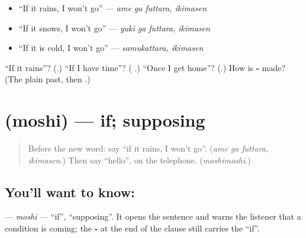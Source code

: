 \begin{itemize}
\raggedright
  \item \textquotedblleft{}If it rains, I won't go\textquotedblright{} — \emph{ame ga futtara, ikimasen}
  \item \textquotedblleft{}If it snows, I won't go\textquotedblright{} — \emph{yuki ga futtara, ikimasen}
  \item \textquotedblleft{}If it is cold, I won't go\textquotedblright{} — \emph{samukattara, ikimasen}
\end{itemize}

\begin{tcolorbox}[breakable,colback=teal!4,colframe=teal!35!black,title={Before you move on}]
\textquotedblleft{}If it rains\textquotedblright{}? (\textbf{}.) \textquotedblleft{}If I have time\textquotedblright{}? (\textbf{ }.) \textquotedblleft{}Once I get home\textquotedblright{}? (\textbf{}.) How is \textbf{-} made? (The plain past, then \textbf{}.)
\end{tcolorbox}
\section[\texorpdfstring{\ja{もし} (moshi)}{もし (moshi)}]{ (moshi) — if; supposing}

\label{lesson:JA-C260-moshi}



\begin{quote}
Before the new word: say \textquotedblleft{}if it rains, I won't go\textquotedblright{}. (\emph{ame ga futtara, ikimasen}.) Then say \textquotedblleft{}hello\textquotedblright{}, on the telephone. (\emph{moshimoshi}.)
\end{quote}

\subsection*{You'll want to know: }
\textbf{} — \emph{moshi} — \textquotedblleft{}if\textquotedblright{}, \textquotedblleft{}supposing\textquotedblright{}. It opens the sentence and warns the listener that a condition is coming; the \textbf{-} at the end of the clause still carries the \textquotedblleft{}if\textquotedblright{}.

\begin{quote}
\textbf{  }
\end{quote}

